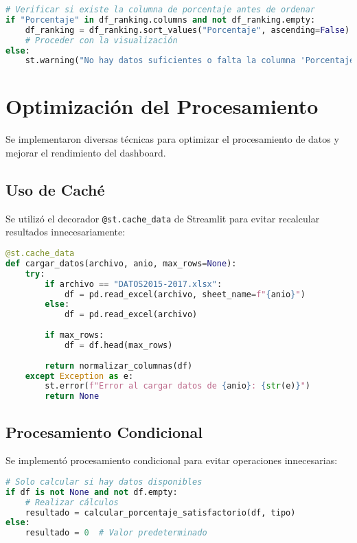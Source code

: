 \begin{lstlisting}[language=Python, caption=Ejemplo de validación de columnas]
# Verificar si existe la columna de porcentaje antes de ordenar
if "Porcentaje" in df_ranking.columns and not df_ranking.empty:
    df_ranking = df_ranking.sort_values("Porcentaje", ascending=False)
    # Proceder con la visualización
else:
    st.warning("No hay datos suficientes o falta la columna 'Porcentaje' para mostrar el ranking.")
\end{lstlisting}

\section{Optimización del Procesamiento}
Se implementaron diversas técnicas para optimizar el procesamiento de datos y mejorar el rendimiento del dashboard.

\subsection{Uso de Caché}
Se utilizó el decorador \texttt{@st.cache\_data} de Streamlit para evitar recalcular resultados innecesariamente:

\begin{lstlisting}[language=Python, caption=Implementación de caché]
@st.cache_data
def cargar_datos(archivo, anio, max_rows=None):
    try:
        if archivo == "DATOS2015-2017.xlsx":
            df = pd.read_excel(archivo, sheet_name=f"{anio}")
        else:
            df = pd.read_excel(archivo)
        
        if max_rows:
            df = df.head(max_rows)
            
        return normalizar_columnas(df)
    except Exception as e:
        st.error(f"Error al cargar datos de {anio}: {str(e)}")
        return None
\end{lstlisting}

\subsection{Procesamiento Condicional}
Se implementó procesamiento condicional para evitar operaciones innecesarias:

\begin{lstlisting}[language=Python, caption=Ejemplo de procesamiento condicional]
# Solo calcular si hay datos disponibles
if df is not None and not df.empty:
    # Realizar cálculos
    resultado = calcular_porcentaje_satisfactorio(df, tipo)
else:
    resultado = 0  # Valor predeterminado
\end{lstlisting}

